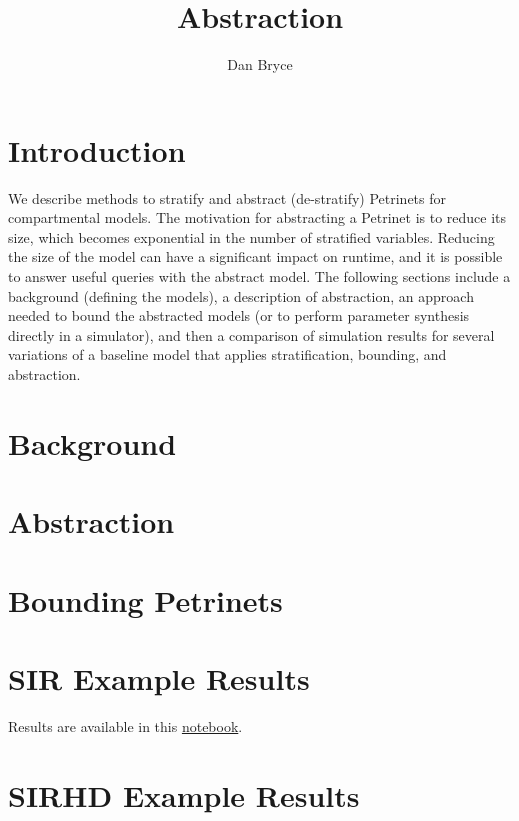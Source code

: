 \documentclass[10pt,letterpaper]{article}
\title{\funman Abstraction}
\author{Dan Bryce}
\begin{document}
\maketitle

\section{Introduction}

We describe methods to stratify and abstract (de-stratify) Petrinets for compartmental models.  The motivation for abstracting a Petrinet is to reduce its size, which becomes exponential in the number of stratified variables.  Reducing the size of the model can have a significant impact on runtime, and it is possible to answer useful queries with the abstract model.  The following sections include a background (defining the models), a description of abstraction, an approach needed to bound the abstracted models (or to perform parameter synthesis directly in a simulator), and then a comparison of simulation results for several variations of a baseline model that applies stratification, bounding, and abstraction.  

\section{Background}


\section{Abstraction}


\section{Bounding Petrinets}


\section{SIR Example Results}
Results are available in this \href{https://github.com/siftech/funman/blob/sep-monthly-demo/notebooks/abstraction-bounding-demo.ipynb}{notebook}.

\section{SIRHD Example Results}


\end{document}
